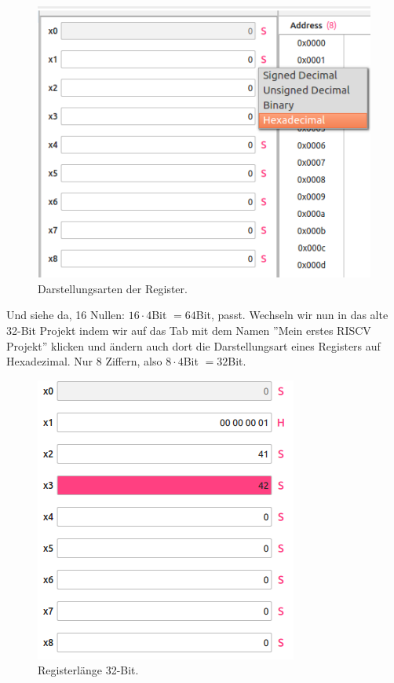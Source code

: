 \begin{figure}[H]
	\centering
	\includegraphics[scale=1.0]{Images/first-steps-9.png}
	\caption{Darstellungsarten der Register.}
\end{figure}

Und siehe da, 16 Nullen: $16 \cdot 4$Bit $=64$Bit, passt. Wechseln wir nun in
das alte 32-Bit Projekt indem wir auf das Tab mit dem Namen ''Mein erstes RISCV
Projekt'' klicken und ändern auch dort die Darstellungsart eines Registers auf
Hexadezimal. Nur 8 Ziffern, also $8 \cdot 4$Bit $=32$Bit.
\begin{figure}[H]
	\centering
	\includegraphics[scale=1.0]{Images/first-steps-10.png}
	\caption{Registerlänge 32-Bit.}
\end{figure}

